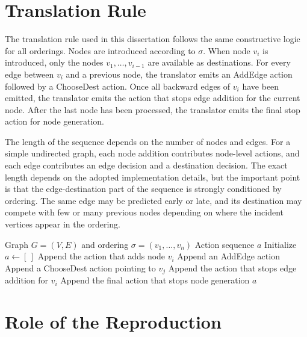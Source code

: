 \section{Translation Rule}
\label{sec:dgmg-translation-rule}

The translation rule used in this dissertation follows the same constructive logic for all orderings. Nodes are introduced according to $\sigma$. When node $v_i$ is introduced, only the nodes $v_1,\ldots,v_{i-1}$ are available as destinations. For every edge between $v_i$ and a previous node, the translator emits an AddEdge action followed by a ChooseDest action. Once all backward edges of $v_i$ have been emitted, the translator emits the action that stops edge addition for the current node. After the last node has been processed, the translator emits the final stop action for node generation.

The length of the sequence depends on the number of nodes and edges. For a simple undirected graph, each node addition contributes node-level actions, and each edge contributes an edge decision and a destination decision. The exact length depends on the adopted implementation details, but the important point is that the edge-destination part of the sequence is strongly conditioned by ordering. The same edge may be predicted early or late, and its destination may compete with few or many previous nodes depending on where the incident vertices appear in the ordering.

\begin{algorithm}[H]
\caption{Graph-to-sequence translation under a node ordering}
\label{alg:translator}
\begin{algorithmic}[1]
\Require Graph $G=(V,E)$ and ordering $\sigma=(v_1,\ldots,v_n)$
\Ensure Action sequence $a$
\State Initialize $a\leftarrow [\,]$
    \State Append the action that adds node $v_i$
        \State Append an AddEdge action
        \State Append a ChooseDest action pointing to $v_j$
    \EndFor
    \State Append the action that stops edge addition for $v_i$
\EndFor
\State Append the final action that stops node generation
\State \Return $a$
\end{algorithmic}
\end{algorithm}

\section{Role of the Reproduction}
\label{sec:dgmg-role}

